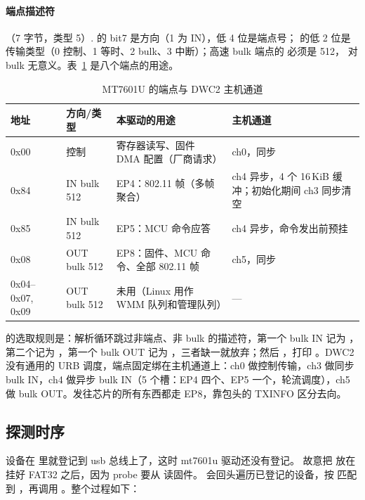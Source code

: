 \paragraph{端点描述符}（7 字节，类型 5）.  的 bit7 是方向（1 为 IN），低 4 位是端点号； 的低 2 位是传输类型（0 控制、1 等时、2 bulk、3 中断）；高速 bulk 端点的  必须是 512， 对 bulk 无意义。表~\ref{tab:mt7601u-ep} 是八个端点的用途。

\begin{table}[htbp]
  \centering
  \caption{MT7601U 的端点与 DWC2 主机通道}
  \label{tab:mt7601u-ep}
  \small
  \begin{tabularx}{\linewidth}{@{}lllX@{}}
    \toprule
    地址 & 方向/类型 & 本驱动的用途 & 主机通道 \\
    \midrule
    0x00 & 控制 & 寄存器读写、固件 DMA 配置（厂商请求） & ch0，同步 \\
    0x84 & IN bulk 512 & EP4：802.11 帧（多帧聚合） & ch4 异步，4 个 16\,KiB 缓冲；初始化期间 ch3 同步清空 \\
    0x85 & IN bulk 512 & EP5：MCU 命令应答 & ch4 异步，命令发出前预挂 \\
    0x08 & OUT bulk 512 & EP8：固件、MCU 命令、全部 802.11 帧 & ch5，同步 \\
    0x04--0x07, 0x09 & OUT bulk 512 & 未用（Linux 用作 WMM 队列和管理队列） & --- \\
    \bottomrule
  \end{tabularx}
\end{table}

 的选取规则是：解析循环跳过非端点、非 bulk 的描述符，第一个 bulk IN 记为 ，第二个记为 ，第一个 bulk OUT 记为 ，三者缺一就放弃；然后 ，打印 。DWC2 没有通用的 URB 调度，端点固定绑在主机通道上：ch0 做控制传输，ch3 做同步 bulk IN，ch4 做异步 bulk IN（5 个槽：EP4 四个、EP5 一个，轮流调度），ch5 做 bulk OUT。发往芯片的所有东西都走 EP8，靠包头的 TXINFO 区分去向。

\subsection{探测时序}
\label{sec:mt7601u-probe}

设备在  里就登记到 usb 总线上了，这时 mt7601u 驱动还没有登记。 故意把  放在  挂好 FAT32 之后，因为 probe 要从  读固件。 会回头遍历已登记的设备，按  匹配到 ，再调用 。整个过程如下：


